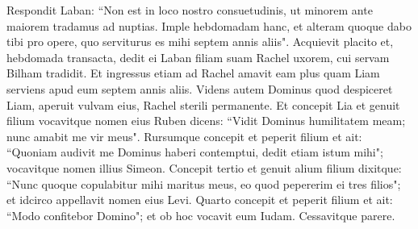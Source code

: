 \begin{biblechapter}
\verse Respondit Laban: “Non est in loco nostro consuetudinis, ut minorem ante maiorem tradamus ad nuptias. 
\verse Imple hebdomadam hanc, et alteram quoque dabo tibi pro opere, quo serviturus es mihi septem annis aliis". 
\verse Acquievit placito et, hebdomada transacta, dedit ei Laban filiam suam Rachel uxorem, 
\verse cui servam Bilham tradidit. 
\verse Et ingressus etiam ad Rachel amavit eam plus quam Liam serviens apud eum septem annis aliis. 
\verse Videns autem Dominus quod despiceret Liam, aperuit vulvam eius, Rachel sterili permanente. 
\verse Et concepit Lia et genuit filium vocavitque nomen eius Ruben dicens: “Vidit Dominus humilitatem meam; nunc amabit me vir meus". 
\verse Rursumque concepit et peperit filium et ait: “Quoniam audivit me Dominus haberi contemptui, dedit etiam istum mihi"; vocavitque nomen illius Simeon. 
\verse Concepit tertio et genuit alium filium dixitque: “Nunc quoque copulabitur mihi maritus meus, eo quod pepererim ei tres filios"; et idcirco appellavit nomen eius Levi. 
\verse Quarto concepit et peperit filium et ait: “Modo confitebor Domino"; et ob hoc vocavit eum Iudam. Cessavitque parere. 
\end{biblechapter}

